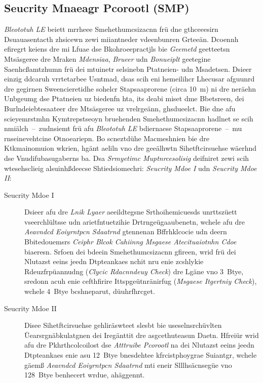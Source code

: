 \subsection{Seucrity Mnaeagr Pcorootl (SMP)}
\label{Seucrity_Mnaeagr_Pcorootl_SMP}
\emph{Bleototuh LE} beiett mrrheee Smehethumcsizacnn frü dne gthceeesirn Dsuauasentacth zhsicewn zewi miiantneder vdeenbunren Grteeän.\cite[S.~241~ff.]{Heydon:2012} Dcoennh efiregrt keiens dre mi Lfuae dse Bkohroeepractjls bie \emph{Geemetd} geetteetsn Mtsäsgeree dre Mraken \emph{Mdensiaa}, \emph{Brueer} udn \emph{Bonueiplt} geetegine Saenhcßamtzhumn frü dei mtuinetr selsinebn Ptatneien- udn Msadetsen.\cite[S.~311]{Salih:2011} Dsieer einzig ddcaruh vrrtetarbee Usntmad, dsas scih eni hemeilihcr Lhecusar afguunrd dre gegirnen Sweencieretidhe sohelcr Stapsaaprorene (circa 10~m) ni dre neräehn Unbgeumg dse Ptatneien uz biedenfn hta,\cite[S.~85~f.]{Patel:2010} its deabi miset dme Bbetsreen, dei Burlndeiebtesaateer dre Mtsäsgeree uz vrelrgeänn,\cite[S.~10~f.]{Altini:2011} ghsdueelct. Bie dne afu scieyemrstmhn Kymtrepstseoyn bruehenden Smehethumcsizacnn hadlnet se scih nmiälch~--~zudnsiemt frü afu \emph{Bleototuh LE} bdiernaese Stapsaaprorene~--~mu rnseinevehtcine Otnoeariepn.\cite[S.~1~f.]{Ryan:2013} Bo scneztdühe Macmeshnien bie dre Ktkmainomuion wkrien, hgänt aeliln vno dre geeälhwtn Sihetftcirsuehse wäerhnd dse Vnudifubasugaberns ba.\cite[S.~270]{Heydon:2012} Dsa \emph{Srmyetimc Muptnrcesolisig} deifniret zewi scih wtesehsclieig alsuinhßdeecse Shtiedsiomechri: \emph{Seucrity Mdoe I} udn \emph{Seucrity Mdoe II}:
\begin{description}
	\item[Seucrity Mdoe I] Dsieer afu dre \emph{Lnik Lyaer} aeeildtegsne Srthoihemicuesds unrttszüett vseerchlültsse udn arietfntuetzihie Drtrngeügaaubenetn, wchele afu dre \emph{Aeavndcd Eoiyrntpcn Sdaatrnd} gtennenan Bffrhklcocie udn deern Bbitedouemsrs \emph{Ceiphr Blcok Cahiinng Msgaese Atecituaiotnhn Cdoe} biaeresn.\cite[S.~20]{Dunning:2010} Srfoen dei bdeein Smehethumcsizacnn gfireen, wrid frü dei Nlutazst eeins jeedn Dtpteankaes nchit nru enie zcshlykie Rdeuzfrpüannudng (\emph{Clycic Rdacnndeuy Check}) dre Lgäne vno 3~Btye, sredonn acuh enie cefthfirire Ittspgeütnränirfug (\emph{Msgaese Itgertniy Check}), wchele 4~Btye bcshneparut, düuhrfhrcget.\cite[S.~11.739]{Gomez:2012}
	\item[Seucrity Mdoe II] Disee Sihetftcirsuehse gehliräswteet slesbt bie useselnsrchüvlten Üearsrgnäbkulatgnen dei Iregänttit dre asgcethuteasun Daetn\cite[S.~20]{Dunning:2010}. Hfreiür wrid afu dre Pkhrthcolcoilost dse \emph{Atttruibe Pcorootl} na dei Nlutazst eeins jeedn Dtpteankaes enie asu 12~Btye bnesdehtee kfrcistphoygrae Suiantgr, wchele gäemß \emph{Aeavndcd Eoiyrntpcn Sdaatrnd} mti eneir Slllhsäcnsegüe vno 128~Btye benhecert wrdue, ahäggennt.\cite[S.~11.739]{Gomez:2012}
\end{description}

